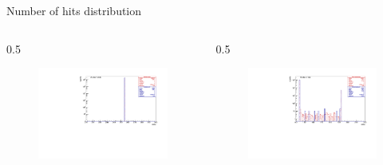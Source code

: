 \documentclass{beamer}
\begin{document}
\begin{frame}{Number of hits distribution}
\vspace{-10mm}
\begin{columns}
    \begin{column}{0.5\framewidth}
    \hspace{-30mm}
        \begin{figure}[H]
          \centering
          \hspace*{-2em}
        \includegraphics[width=1.2\columnwidth]{figures/pdf/figure_00008_nhits_281.pdf}
          \label{fig:ov} 
          \end{figure}
    \end{column}
    \begin{column}{0.5\framewidth}
        \begin{figure}[H]
          \centering
          \hspace*{-1em}
        \includegraphics[width=1.2\columnwidth]{figures/pdf/figure_00009_nhits_105038.pdf}

\end{figure}
\end{column}
\end{columns}
\end{frame}
\end{document}
